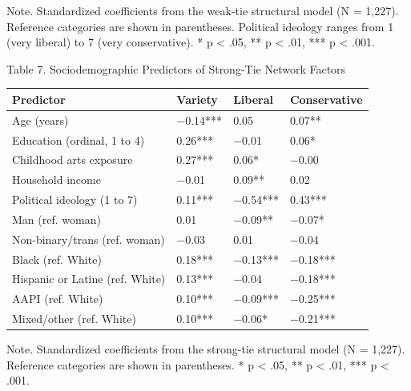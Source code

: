 \documentclass[
  12pt
]{article}
\begin{document}
Note. Standardized coefficients from the weak-tie structural model (N = 1,227). Reference categories are shown in parentheses. Political ideology ranges from 1 (very liberal) to 7 (very conservative). * p < .05, ** p < .01, *** p < .001.

Table 7. Sociodemographic Predictors of Strong-Tie Network Factors

\begin{tabular*}{\textwidth}{@{\extracolsep{\fill}}>{\raggedright\arraybackslash}p{} >{\raggedleft\arraybackslash}p{} >{\raggedleft\arraybackslash}p{} >{\raggedleft\arraybackslash}p{}@{}}
\toprule
Predictor & Variety & Liberal & Conservative \\
\midrule
Age (years) & $-$0.14***\hphantom{} & \hphantom{$-$}0.05\hphantom{***} & \hphantom{$-$}0.07**\hphantom{*} \\
Education (ordinal, 1 to 4) & \hphantom{$-$}0.26***\hphantom{} & $-$0.01\hphantom{***} & \hphantom{$-$}0.06*\hphantom{**} \\
Childhood arts exposure & \hphantom{$-$}0.27***\hphantom{} & \hphantom{$-$}0.06*\hphantom{**} & $-$0.00\hphantom{***} \\
Household income & $-$0.01\hphantom{***} & \hphantom{$-$}0.09**\hphantom{*} & \hphantom{$-$}0.02\hphantom{***} \\
Political ideology (1 to 7) & \hphantom{$-$}0.11***\hphantom{} & $-$0.54***\hphantom{} & \hphantom{$-$}0.43***\hphantom{} \\
Man (ref. woman) & \hphantom{$-$}0.01\hphantom{***} & $-$0.09**\hphantom{*} & $-$0.07*\hphantom{**} \\
Non-binary/trans (ref. woman) & $-$0.03\hphantom{***} & \hphantom{$-$}0.01\hphantom{***} & $-$0.04\hphantom{***} \\
Black (ref. White) & \hphantom{$-$}0.18***\hphantom{} & $-$0.13***\hphantom{} & $-$0.18***\hphantom{} \\
Hispanic or Latine (ref. White) & \hphantom{$-$}0.13***\hphantom{} & $-$0.04\hphantom{***} & $-$0.18***\hphantom{} \\
AAPI (ref. White) & \hphantom{$-$}0.10***\hphantom{} & $-$0.09***\hphantom{} & $-$0.25***\hphantom{} \\
Mixed/other (ref. White) & \hphantom{$-$}0.10***\hphantom{} & $-$0.06*\hphantom{**} & $-$0.21***\hphantom{} \\
\bottomrule
\end{tabular*}

Note. Standardized coefficients from the strong-tie structural model (N = 1,227). Reference categories are shown in parentheses. * p < .05, ** p < .01, *** p < .001.
\end{document}
